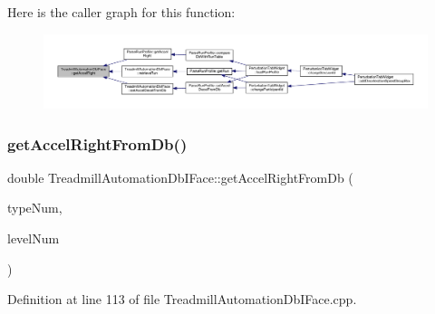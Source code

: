 Here is the caller graph for this function\+:
\nopagebreak
\begin{figure}[H]
\begin{center}
\leavevmode
\includegraphics[width=350pt]{class_treadmill_automation_db_i_face_ad62daf9b289b6c9fa43ffe5846299408_icgraph}
\end{center}
\end{figure}
\mbox{\label{class_treadmill_automation_db_i_face_a43f08ef404ec4688139bdcf2980df2d9}} 
\subsubsection{\texorpdfstring{get\+Accel\+Right\+From\+Db()}{getAccelRightFromDb()}}
{\footnotesize\ttfamily double Treadmill\+Automation\+Db\+I\+Face\+::get\+Accel\+Right\+From\+Db (\begin{DoxyParamCaption}\item[{Q\+String}]{type\+Num,  }\item[{Q\+String}]{level\+Num }\end{DoxyParamCaption})}



Definition at line 113 of file Treadmill\+Automation\+Db\+I\+Face.\+cpp.


